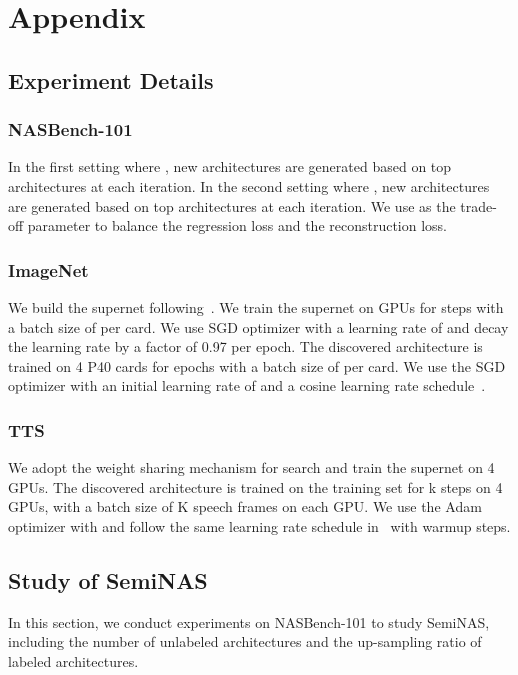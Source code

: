 \documentclass{article}
\begin{document}



\section{Appendix}

\subsection{Experiment Details}
\label{sec:expdetail}
\subsubsection{NASBench-101}
In the first setting where ,  new architectures are generated based on top  architectures at each iteration. In the second setting where ,  new architectures are generated based on top  architectures at each iteration. We use  as the trade-off parameter to balance the regression loss and the reconstruction loss.
\subsubsection{ImageNet}
We build the supernet following~\cite{proxylessnas}. We train the supernet on  GPUs for  steps with a batch size of  per card. We use SGD optimizer with a learning rate of  and decay the learning rate by a factor of 0.97 per epoch. The discovered architecture is trained on 4 P40 cards for  epochs with a batch size of  per card. We use the SGD optimizer with an initial learning rate of  and a cosine learning rate schedule~\cite{sgdr}.
\subsubsection{TTS}
We adopt the weight sharing mechanism for search and train the supernet on 4 GPUs. The discovered architecture is trained on the training set for k steps on 4 GPUs, with a batch size of K speech frames on each GPU. We use the Adam optimizer with  and follow the same learning rate schedule in~\cite{transformertts} with  warmup steps.


\subsection{Study of SemiNAS}
\label{sec:hyperpara}
In this section, we conduct experiments on NASBench-101 to study SemiNAS, including the number of unlabeled architectures  and the up-sampling ratio of labeled architectures.
\end{document}
